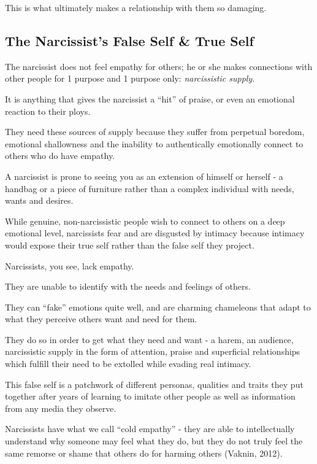 \documentclass[oneside]{book}
\numberwithin{equation}{section}
\begin{document}
This is what ultimately makes a relationship with them so damaging.

\subsection{The Narcissist's False Self \& True Self}
The narcissist does not feel empathy for others; he or she makes connections with other people for 1 purpose and 1 purpose only: \emph{narcissistic supply}.


It is anything that gives the narcissist a ``hit'' of praise, or even an emotional reaction to their ploys.

They need these sources of supply because they suffer from perpetual boredom, emotional shallowness and the inability to authentically emotionally connect to others who do have empathy.

%
A narcissist is prone to seeing you as an extension of himself or herself - a handbag or a piece of furniture rather than a complex individual with needs, wants and desires.

While genuine, non-narcissistic people wish to connect to others on a deep emotional level, narcissists fear and are disgusted by intimacy because intimacy would expose their true self rather than the false self they project.

%
Narcissists, you see, lack empathy.

They are unable to identify with the needs and feelings of others.

They can ``fake'' emotions quite well, and are charming chameleons that adapt to what they perceive others want and need for them.

They do so in order to get what they need and want - a harem, an audience, narcissistic supply in the form of attention, praise and superficial relationships which fulfill their need to be extolled while evading real intimacy.

%
This false self is a patchwork of different personas, qualities and traits they put together after years of learning to imitate other people as well as information from any media they observe.

Narcissists have what we call ``cold empathy'' - they are able to intellectually understand why someone may feel what they do, but they do not truly feel the same remorse or shame that others do for harming others (Vaknin, 2012).
\end{document}
